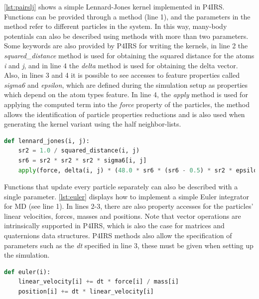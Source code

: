 \documentclass[preprint,12pt]{elsarticle}
\begin{document}
\autoref{lst:pairslj} shows a simple Lennard-Jones kernel implemented in P4IRS.
Functions can be provided through a method (line 1), and the parameters in the method refer to different particles in the system.
In this way, many-body potentials can also be described using methods with more than two parameters.
Some keywords are also provided by P4IRS for writing the kernels, in line 2 the \emph{squared\_distance} method is used for obtaining the squared distance for the atoms \emph{i} and \emph{j}, and in line 4 the \emph{delta} method is used for obtaining the delta vector.
Also, in lines 3 and 4 it is possible to see accesses to feature properties called \emph{sigma6} and \emph{epsilon}, which are defined during the simulation setup as properties which depend on the atom types feature.
In line 4, the \emph{apply} method is used for applying the computed term into the \emph{force} property of the particles, the method allows the identification of particle properties reductions and is also used when generating the kernel variant using the half neighbor-lists.

\begin{lstlisting}[language=Python,
		   label={lst:pairslj},
		   caption={Lennard-Jones force description in P4IRS.}]
def lennard_jones(i, j):
    sr2 = 1.0 / squared_distance(i, j)
    sr6 = sr2 * sr2 * sr2 * sigma6[i, j]
    apply(force, delta(i, j) * (48.0 * sr6 * (sr6 - 0.5) * sr2 * epsilon[i, j]))
\end{lstlisting}

Functions that update every particle separately can also be described with a single parameter.
\autoref{lst:euler} displays how to implement a simple Euler integrator for \ac{MD} (see line 1).
In lines 2-3, there are also property accesses for the particles' linear velocities, forces, masses and positions.
Note that vector operations are intrinsically supported in P4IRS, which is also the case for matrices and quaternions data structures.
P4IRS methods also allow the specification of parameters such as the \emph{dt} specified in line 3, these must be given when setting up the simulation.

\begin{lstlisting}[language=Python,
		   label={lst:euler},
		   caption={Euler integrator description in P4IRS.}]
def euler(i):
    linear_velocity[i] += dt * force[i] / mass[i]
    position[i] += dt * linear_velocity[i]
\end{lstlisting}
\end{document}
